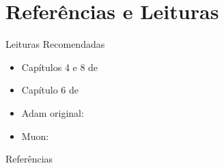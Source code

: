 \documentclass[aspectratio=169,xcolor=dvipsnames]{beamer}
\begin{document}
  \section*{Referências e Leituras}
  \begin{frame}{Leituras Recomendadas}
    \leiturasize
    \begin{itemize}
      \item Capítulos 4 e 8 de 
      \item Capítulo 6 de 
      \item Adam original: 
      \item Muon: 
    \end{itemize}
  \end{frame}

  \begin{frame}[allowframebreaks]{Referências}
    \sloppy
    \printbibliography[heading=none]
  \end{frame}
\end{document}
